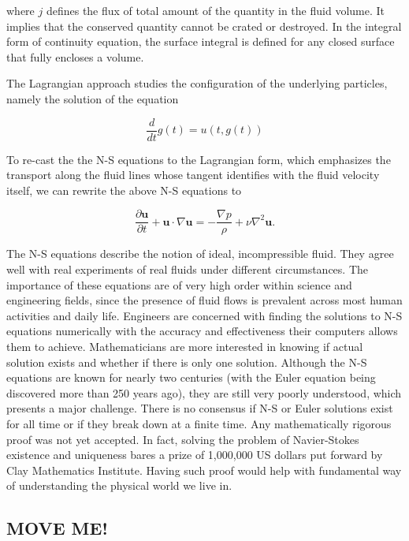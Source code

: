 where $j$ defines the flux of total amount of the quantity in the fluid volume. It implies that the conserved quantity cannot be crated or destroyed. In the integral form of continuity equation, the surface integral is defined for any closed surface that fully encloses a volume. 

The Lagrangian approach studies the configuration of the underlying particles, namely the solution of the equation

\begin{equation} 
	\label{eqn:lagrange-hydro}
	\frac{d}{dt} g(t) = u(t, g(t))
\end{equation}

To re-cast the the N-S equations to the Lagrangian form, which emphasizes the transport along the fluid lines whose tangent identifies with the fluid velocity itself, we can rewrite the above N-S equations to

\begin{equation} 
	\label{eqn:lagrange-ns-modern}
	\frac{\partial \bm{u}}{\partial t} + \bm{u} \cdot \nabla \bm{u} = - \frac{\nabla p}{\rho} + \nu \nabla^2 \bm{u}.
\end{equation}

The N-S equations describe the notion of ideal, incompressible fluid. They agree well with real experiments of real fluids under different circumstances. The importance of these equations are of very high order within science and engineering fields, since the presence of fluid flows is prevalent across most human activities and daily life. Engineers are concerned with finding the solutions to N-S equations numerically with the accuracy and effectiveness their computers allows them to achieve. Mathematicians are more interested in knowing if actual solution exists and whether if there is only one solution. Although the N-S equations are known for nearly two centuries (with the Euler equation being discovered more than 250 years ago), they are still very poorly understood, which presents a major challenge. There is no consensus if N-S or Euler solutions exist for all time or if they break down at a finite time. Any mathematically rigorous proof was not yet accepted. In fact, solving the problem of Navier-Stokes existence and uniqueness bares a prize of 1,000,000 US dollars put forward by Clay Mathematics Institute. Having such proof would help with fundamental way of understanding the physical world we live in.

\subsection{MOVE ME!}




